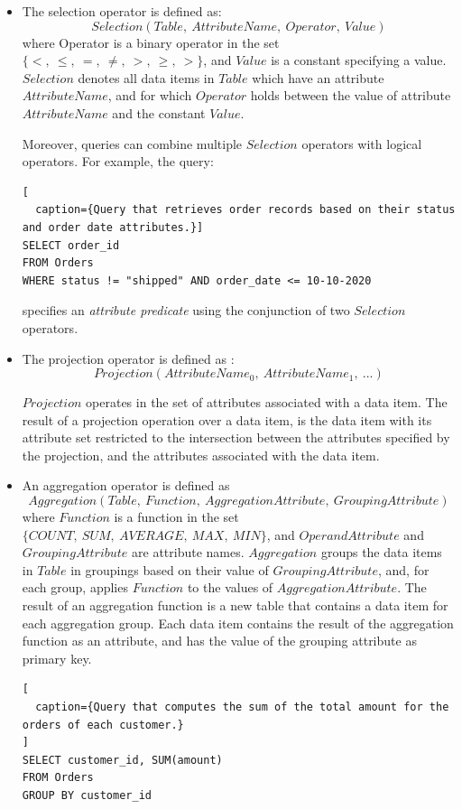 \begin{itemize}
  \item The selection operator is defined as:
  \[
  Selection(Table,~AttributeName,~Operator,~Value)
  \]
  where Operator is a binary operator in the set $\{<,~\leq,~=,~\neq,~>,~\geq,~>\}$,
  and $Value$ is a constant specifying a value.
  $Selection$ denotes all data items in $Table$ which
  have an attribute $AttributeName$,
  and for which $Operator$ holds between the value of attribute $AttributeName$ and the constant $Value$.

  Moreover, queries can combine multiple $Selection$ operators with logical operators.
  For example, the query:

\begin{lstlisting}[
  caption={Query that retrieves order records based on their status and order date attributes.}]
SELECT order_id
FROM Orders
WHERE status != "shipped" AND order_date <= 10-10-2020
\end{lstlisting}

  specifies an \textit{attribute predicate} using the conjunction of two $Selection$ operators.

  \item The projection operator is defined as :
  \[
  Projection(AttributeName_0,~AttributeName_1,~...)
  \]

  $Projection$ operates in the set of attributes associated with a data item.
  The result of a projection operation over a data item, is the data item with its attribute set restricted to the
  intersection between the attributes specified by the projection, and the attributes associated with the data item.

  \item An aggregation operator is defined as
  \[
  Aggregation(Table,~Function,~AggregationAttribute,~GroupingAttribute)
  \]
  where $Function$ is a function in the set $\{COUNT,~SUM,~AVERAGE,~MAX,~MIN\}$,
  and $OperandAttribute$ and $GroupingAttribute$ are attribute names.
  $Aggregation$ groups the data items in $Table$ in groupings based on their value of $GroupingAttribute$,
  and, for each group, applies $Function$ to the values of $AggregationAttribute$.
  The result of an aggregation function is a new table that contains a data item for each aggregation group.
  Each data item contains the result of the aggregation function as an attribute, and has the value of the grouping attribute as primary key.

\begin{lstlisting}[
  caption={Query that computes the sum of the total amount for the orders of each customer.}
]
SELECT customer_id, SUM(amount)
FROM Orders
GROUP BY customer_id
\end{lstlisting}


\end{itemize}
